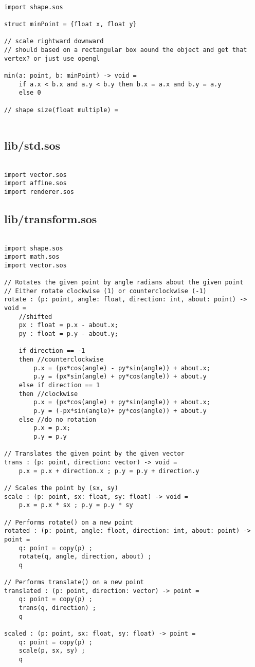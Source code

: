 \documentclass[main.tex]{subfiles}
\begin{document}
\begin{lstlisting}

import shape.sos

struct minPoint = {float x, float y}

// scale rightward downward
// should based on a rectangular box aound the object and get that vertex? or just use opengl

min(a: point, b: minPoint) -> void =
    if a.x < b.x and a.y < b.y then b.x = a.x and b.y = a.y
    else 0

// shape size(float multiple) =
    

\end{lstlisting}

\subsection{lib/std.sos}

\begin{lstlisting}

import vector.sos
import affine.sos
import renderer.sos
\end{lstlisting}

\subsection{lib/transform.sos}

\begin{lstlisting}

import shape.sos
import math.sos
import vector.sos

// Rotates the given point by angle radians about the given point
// Either rotate clockwise (1) or counterclockwise (-1)
rotate : (p: point, angle: float, direction: int, about: point) -> void =
    //shifted
    px : float = p.x - about.x;
    py : float = p.y - about.y;

    if direction == -1
    then //counterclockwise
        p.x = (px*cos(angle) - py*sin(angle)) + about.x;
        p.y = (px*sin(angle) + py*cos(angle)) + about.y
    else if direction == 1
    then //clockwise
        p.x = (px*cos(angle) + py*sin(angle)) + about.x;
        p.y = (-px*sin(angle)+ py*cos(angle)) + about.y
    else //do no rotation
        p.x = p.x;
        p.y = p.y 

// Translates the given point by the given vector
trans : (p: point, direction: vector) -> void = 
    p.x = p.x + direction.x ; p.y = p.y + direction.y

// Scales the point by (sx, sy)
scale : (p: point, sx: float, sy: float) -> void =
    p.x = p.x * sx ; p.y = p.y * sy

// Performs rotate() on a new point
rotated : (p: point, angle: float, direction: int, about: point) -> point =
    q: point = copy(p) ;
    rotate(q, angle, direction, about) ;
    q

// Performs translate() on a new point
translated : (p: point, direction: vector) -> point =
    q: point = copy(p) ;
    trans(q, direction) ;
    q

scaled : (p: point, sx: float, sy: float) -> point = 
    q: point = copy(p) ; 
    scale(p, sx, sy) ;
    q
\end{lstlisting}
\end{document}
